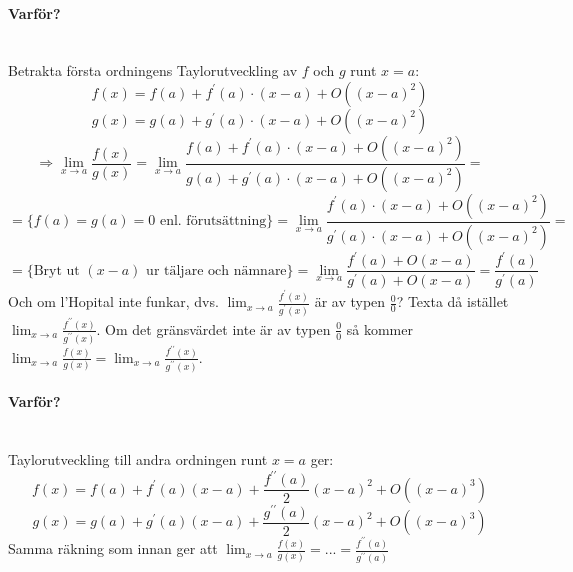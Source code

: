 \paragraph*{Varför?}~\\
Betrakta första ordningens Taylorutveckling av $f$ och $g$ runt $x=a$:
\begin{equation*}
    f(x)=f(a)+f^\prime(a)\cdot (x-a)+O((x-a)^2)
\end{equation*}
\begin{equation*}
    g(x)=g(a)+g^\prime(a)\cdot (x-a)+O((x-a)^2)
\end{equation*}
\begin{equation*}
    \Rightarrow\lim_{x\to a}\frac{f(x)}{g(x)}=\lim_{x\to a}\frac{f(a)+f^\prime(a)\cdot (x-a)+O((x-a)^2)}{g(a)+g^\prime(a)\cdot (x-a)+O((x-a)^2)}=
\end{equation*}
\begin{equation*}
    =\{f(a)=g(a)=0 \text{ enl. förutsättning}\}=\lim_{x\to a}\frac{f^\prime(a)\cdot (x-a)+O((x-a)^2)}{g^\prime(a)\cdot (x-a)+O((x-a)^2)}=
\end{equation*}
\begin{equation*}
    =\{\text{Bryt ut }(x-a)\text{ ur täljare och nämnare}\}=\lim_{x\to a}\frac{f^\prime(a)+O(x-a)}{g^\prime(a)+O(x-a)}=\frac{f^\prime(a)}{g^\prime(a)}
\end{equation*}
Och om l'Hopital inte funkar, dvs. $\lim_{x\to a}\frac{f^\prime(x)}{g^\prime(x)}$ är av typen $\frac{0}{0}$?
Texta då istället $\lim_{x\to a}\frac{f^{\prime\prime}(x)}{g^{\prime\prime}(x)}$.
Om det gränsvärdet inte är av typen $\frac{0}{0}$ så kommer $\lim_{x\to a}\frac{f(x)}{g(x)}=\lim_{x\to a}\frac{f^{\prime\prime}(x)}{g^{\prime\prime}(x)}$.
\paragraph*{Varför?}~\\
Taylorutveckling till andra ordningen runt $x=a$ ger:
\begin{equation*}
    f(x)=f(a)+f^\prime(a)(x-a)+\frac{f^{\prime\prime}(a)}{2}(x-a)^2+O((x-a)^3)
\end{equation*}
\begin{equation*}
    g(x)=g(a)+g^\prime(a)(x-a)+\frac{g^{\prime\prime}(a)}{2}(x-a)^2+O((x-a)^3)
\end{equation*}
Samma räkning som innan ger att $\lim_{x\to a}\frac{f(x)}{g(x)}=...=\frac{f^{\prime\prime}(a)}{g^{\prime\prime}(a)}$

